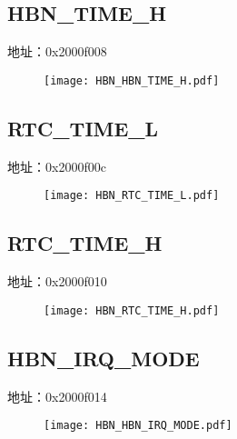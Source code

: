 \subsection{HBN\_TIME\_H}
\label{HBN-HBN-TIME-H}
地址：0x2000f008
 \begin{figure}[H]
\texttt{[image: HBN\_HBN\_TIME\_H.pdf]}
\end{figure}

\subsection{RTC\_TIME\_L}
\label{HBN-RTC-TIME-L}
地址：0x2000f00c
 \begin{figure}[H]
\texttt{[image: HBN\_RTC\_TIME\_L.pdf]}
\end{figure}

\subsection{RTC\_TIME\_H}
\label{HBN-RTC-TIME-H}
地址：0x2000f010
 \begin{figure}[H]
\texttt{[image: HBN\_RTC\_TIME\_H.pdf]}
\end{figure}

\subsection{HBN\_IRQ\_MODE}
\label{HBN-HBN-IRQ-MODE}
地址：0x2000f014
 \begin{figure}[H]
\texttt{[image: HBN\_HBN\_IRQ\_MODE.pdf]}
\end{figure}

